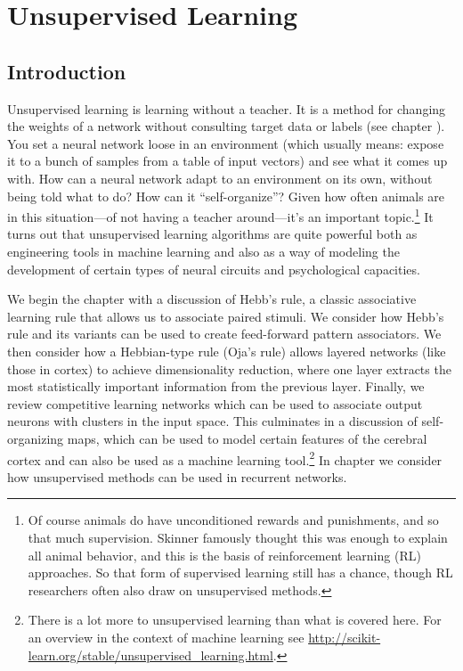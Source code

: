 \chapter{Unsupervised Learning}\label{ch_unsupervised}

\section{Introduction}

Unsupervised learning is learning without a teacher. It is a method for changing the weights of a network without consulting target data or labels (see chapter ). You set a neural network loose in an environment (which usually means: expose it to a bunch of samples from a table of input vectors) and see what it comes up with. How can a neural network adapt to an environment on its own, without being told what to do?  How can it ``self-organize''? Given how often animals are in this situation---of not having a teacher around---it's an important topic.\footnote{Of course animals do have unconditioned rewards and punishments, and so that much supervision. Skinner famously thought this was enough to explain all animal behavior, and this is the basis of reinforcement learning (RL) approaches. So that form of supervised learning still has a chance, though RL researchers often also draw on unsupervised methods.} It turns out that unsupervised learning algorithms are quite powerful both as engineering tools in machine learning and also as a way of modeling the development of certain types of neural circuits and psychological capacities.

We begin the chapter with a discussion of Hebb's rule, a classic associative learning rule that allows us to associate paired stimuli. We consider how Hebb's rule and its variants can be used to create feed-forward pattern associators. We then consider how a Hebbian-type rule (Oja's rule) allows layered networks (like those in cortex) to achieve dimensionality reduction, where one layer extracts the most statistically important information from the previous layer. Finally, we review competitive learning networks which can be used to associate output neurons with clusters in the input space. This culminates in a discussion of self-organizing maps, which can be used to model certain features of the cerebral cortex and can also be used as a machine learning tool.\footnote{There is a lot more to unsupervised learning than what is covered here. For an overview in the context of machine learning see \url{http://scikit-learn.org/stable/unsupervised_learning.html}.}  In chapter  we consider how unsupervised methods can be used in recurrent networks.

